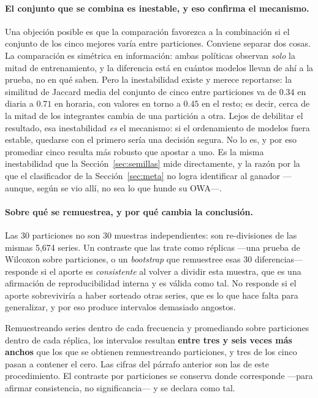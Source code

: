 \paragraph{El conjunto que se combina es inestable, y eso confirma el mecanismo.} Una
objeción posible es que la comparación favorezca a la combinación si el conjunto de los
cinco mejores varía entre particiones. Conviene separar dos cosas. La comparación es
simétrica en información: ambas políticas observan \emph{solo} la mitad de
entrenamiento, y la diferencia está en cuántos modelos llevan de ahí a la prueba, no en
qué saben. Pero la inestabilidad existe y merece reportarse: la similitud de Jaccard
media del conjunto de cinco entre particiones va de $0.34$ en diaria a $0.71$ en
horaria, con valores en torno a $0.45$ en el resto; es decir, cerca de la mitad de los
integrantes cambia de una partición a otra. Lejos de debilitar el resultado, esa
inestabilidad \emph{es} el mecanismo: si el ordenamiento de modelos fuera estable,
quedarse con el primero sería una decisión segura. No lo es, y por eso promediar cinco
resulta más robusto que apostar a uno. Es la misma inestabilidad que la
Sección~\ref{sec:semillas} mide directamente, y la razón por la que el clasificador de la
Sección~\ref{sec:meta} no logra identificar al ganador ---aunque, según se vio allí, no
sea lo que hunde su OWA---.

\paragraph{Sobre qué se remuestrea, y por qué cambia la conclusión.} Las 30 particiones
no son 30 muestras independientes: son re-divisiones de las mismas 5{,}674 series. Un
contraste que las trate como réplicas ---una prueba de Wilcoxon sobre particiones, o un
\emph{bootstrap} que remuestree esas 30 diferencias--- responde si el aporte es
\emph{consistente} al volver a dividir esta muestra, que es una afirmación de
reproducibilidad interna y es válida como tal. No responde si el aporte sobreviviría a
haber sorteado otras series, que es lo que hace falta para generalizar, y por eso produce
intervalos demasiado angostos.

Remuestreando series dentro de cada frecuencia y promediando sobre particiones dentro de
cada réplica, los intervalos resultan \textbf{entre tres y seis veces más anchos} que los
que se obtienen remuestreando particiones, y tres de los cinco pasan a contener el cero.
Las cifras del párrafo anterior son las de este procedimiento. El contraste por
particiones se conserva donde corresponde ---para afirmar consistencia, no
significancia--- y se declara como tal.

